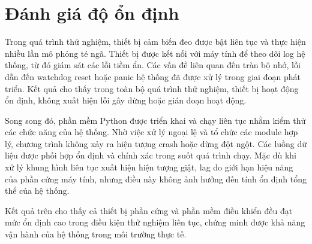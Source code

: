 \section{Đánh giá độ ổn định}
\label{sec:stability_evaluation}

Trong quá trình thử nghiệm, thiết bị cảm biến đeo được bật liên tục và thực hiện nhiều lần mô phỏng té ngã. Thiết bị được kết nối với máy tính để theo dõi log hệ thống, từ đó giám sát các lỗi tiềm ẩn. Các vấn đề liên quan đến tràn bộ nhớ, lỗi dẫn đến watchdog reset hoặc panic hệ thống đã được xử lý trong giai đoạn phát triển. Kết quả cho thấy trong toàn bộ quá trình thử nghiệm, thiết bị hoạt động ổn định, không xuất hiện lỗi gây dừng hoặc gián đoạn hoạt động.

Song song đó, phần mềm Python được triển khai và chạy liên tục nhằm kiểm thử các chức năng của hệ thống. Nhờ việc xử lý ngoại lệ và tổ chức các module hợp lý, chương trình không xảy ra hiện tượng crash hoặc dừng đột ngột. Các luồng dữ liệu được phối hợp ổn định và chính xác trong suốt quá trình chạy. Mặc dù khi xử lý khung hình liên tục xuất hiện hiện tượng giật, lag do giới hạn hiệu năng của phần cứng máy tính, nhưng điều này không ảnh hưởng đến tính ổn định tổng thể của hệ thống.

Kết quả trên cho thấy cả thiết bị phần cứng và phần mềm điều khiển đều đạt mức ổn định cao trong điều kiện thử nghiệm liên tục, chứng minh được khả năng vận hành của hệ thống trong môi trường thực tế.

